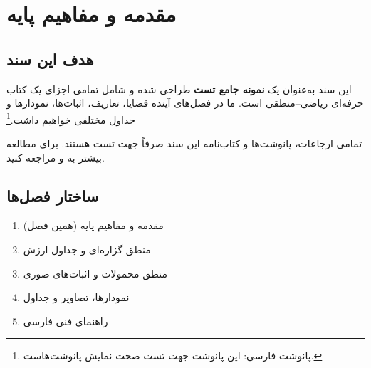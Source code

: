 \documentclass[12pt,a4paper,twoside]{book}
\title{%
  {\color{PrimaryBlue}\rule{\textwidth}{2pt}}\$$0.5cm]
  {\Huge\bfseries مبانی منطق ریاضی و اثبات‌های صوری}\\[0.3cm]
  {\Large\color{DarkText}
    Foundations of Mathematical Logic and Formal Proofs}\\[0.3cm]
  {\color{PrimaryBlue}\rule{\textwidth}{2pt}}
}
\author{%
  {\large علی محمدی (Ali Mohammadi)}\\[2pt]
  {\small\href{mailto:ali@example.com}{ali@example.com}}
}
\date{{\small تابستان ۱۴۰۴ — Summer 2025}}
\begin{document}
\frontmatter
\maketitle

\tableofcontents
\listoffigures
\listoftables

\mainmatter

\chapter{مقدمه و مفاهیم پایه}
\label{chap:intro}

\section{هدف این سند}

این سند
به‌عنوان یک \textbf{نمونه جامع تست} طراحی شده و شامل تمامی
اجزای یک کتاب حرفه‌ای ریاضی–منطقی است. ما در فصل‌های آینده
قضایا، تعاریف، اثبات‌ها، نمودارها و جداول مختلفی
خواهیم داشت.\footnote{%
  پانوشت فارسی: این پانوشت جهت تست صحت نمایش پانوشت‌هاست.}

\begin{notebox}
  تمامی ارجاعات، پانوشت‌ها و کتاب‌نامه این سند
  صرفاً جهت تست هستند.
  برای مطالعه بیشتر به \cite{knuth1997} و \cite{ebrahimi1399}
  مراجعه کنید.
\end{notebox}

\section{ساختار فصل‌ها}

\begin{enumerate}[label=\textcolor{PrimaryBlue}{\textbf{فصل \arabic*:}},
  leftmargin=*,itemsep=4pt]
  \item مقدمه و مفاهیم پایه (همین فصل)
  \item منطق گزاره‌ای و جداول ارزش
  \item منطق محمولات و اثبات‌های صوری
  \item نمودارها، تصاویر و جداول
  \item راهنمای فنی  فارسی
\end{enumerate}
\end{document}
